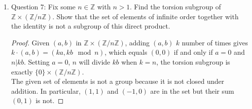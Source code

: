 \documentclass{article}
\begin{document}
\begin{enumerate}
\begin{enumerate}
\begin{proof}
          Consider the group $G=GL_2(\mathbb{R})$, and the following
          elements in $G$:
          \begin{align*}
            A =
            \begin{pmatrix}
              0 & -1 \\
              1 & 0 \\
            \end{pmatrix},\; &&
            B =
            \begin{pmatrix}
              0   & 1 \\
              -1  & -0 \\
            \end{pmatrix}. \\
          \end{align*}
          Then $A^4=B^3=I$, so $A$ and $B$ are in the torsion set of $G$.
          However, we can show by induction on $n$ that 
          \begin{align*}
            (AB)^n =
            \begin{pmatrix}
              0   & n \\
              0   & 1 \\
            \end{pmatrix}, \\
          \end{align*}
          implying that $AB$ is not in the torsion set, which means the
          torsion set is not closed under multiplication and thus cannot be
          a group.
        \end{proof}

      \item Question 7: Fix some $n\in\mathbb{Z}$ with $n>1$. Find the
        torsion subgroup of $\mathbb{Z}\times(\mathbb{Z}/n\mathbb{Z})$.
        Show that the set of elements of infinite order together with the
        identity is not a subgroup of this direct product.

        \begin{proof}
          Given $(a,b)$ in $\mathbb{Z}\times(\mathbb{Z}/n\mathbb{Z})$,
          adding $(a,b)$ $k$ number of times gives $k\cdot(a,b)=(ka,kb\mod
          n)$, which equals $(0,0)$ if and only if $a=0$ and $n|kb$.
          Setting $a=0$, $n$ will divide $kb$ when $k=n$, the torsion
          subgroup is exactly $\{0\}\times(\mathbb{Z}/n\mathbb{Z})$. \\

          The given set of elements is not a group because it is not closed
          under addition. In particular, $(1,1)$ and $(-1,0)$ are in the set
          but their sum $(0,1)$ is not.
        \end{proof}


\end{enumerate}
\end{enumerate}
\end{document}
